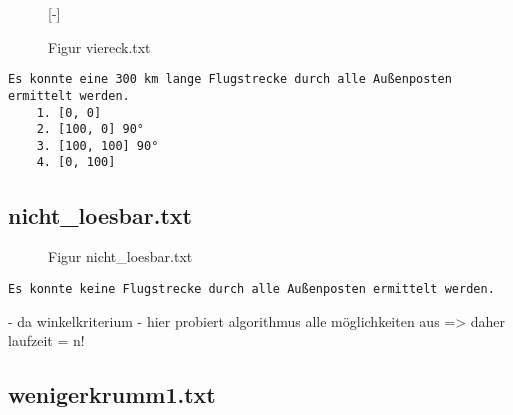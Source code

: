 \documentclass[a4paper,10pt,ngerman]{scrartcl}
\begin{document}
    \begin{figure}[H]
        [-]
        \FigurFuenf{}
        \caption{Figur viereck.txt}
        \label{fig:Figure3}
    \end{figure}

    \begin{lstlisting}[frame=single, title=Programmausgabe viereck.txt, breaklines=true,label={lst:lstlisting3}]
    Es konnte eine 300 km lange Flugstrecke durch alle Außenposten ermittelt werden.
    1. [0, 0]
    2. [100, 0] 90°
    3. [100, 100] 90°
    4. [0, 100]
    \end{lstlisting}

    \subsection{nicht\_loesbar.txt}\label{subsec:nichtloesbar.txt}


    \begin{figure}[H]
        \centering
        \caption{Figur nicht\_loesbar.txt}
        \label{fig:Figure4}
    \end{figure}

    \begin{lstlisting}[frame=single, title=Programmausgabe nicht\_loesbar.txt, breaklines=true,label={lst:lstlisting4}]
    Es konnte keine Flugstrecke durch alle Außenposten ermittelt werden.
    \end{lstlisting}

    - da winkelkriterium
    - hier probiert algorithmus alle möglichkeiten aus
    => daher laufzeit = n!

    \subsection{wenigerkrumm1.txt}\label{subsec:wenigerkrumm1.txt}
\end{document}

